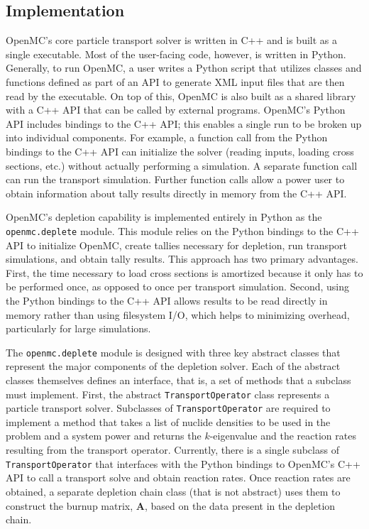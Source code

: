 \documentclass[3p,authoryear]{elsarticle}
\newcommand{\vect}[1]{\mathbf{#1}} %
\begin{document}
\subsection{Implementation}

OpenMC's core particle transport solver is written in C++ and is built as a
single executable. Most of the user-facing code, however, is written in Python.
Generally, to run OpenMC, a user writes a Python script that utilizes classes
and functions defined as part of an API to generate XML input files that are
then read by the executable. On top of this, OpenMC is also built as a shared
library with a C++ API that can be called by external programs. OpenMC's Python
API includes bindings to the C++ API; this enables a single run to be broken up
into individual components. For example, a function call from the Python
bindings to the C++ API can initialize the solver (reading inputs, loading cross
sections, etc.) without actually performing a simulation. A separate function
call can run the transport simulation. Further function calls allow a power user
to obtain information about tally results directly in memory from the C++ API.

OpenMC's depletion capability is implemented entirely in Python as the
\texttt{openmc.deplete} module. This module relies on the Python bindings to the
C++ API to initialize OpenMC, create tallies necessary for depletion, run
transport simulations, and obtain tally results. This approach has two primary
advantages. First, the time necessary to load cross sections is amortized
because it only has to be performed once, as opposed to once per transport
simulation. Second, using the Python bindings to the C++ API allows results to
be read directly in memory rather than using filesystem I/O, which helps to
minimizing overhead, particularly for large simulations.

The \texttt{openmc.deplete} module is designed with three key abstract classes
that represent the major components of the depletion solver. Each of the
abstract classes themselves defines an interface, that is, a set of methods that
a subclass must implement. First, the abstract \texttt{TransportOperator} class
represents a particle transport solver. Subclasses of \texttt{TransportOperator}
are required to implement a method that takes a list of nuclide densities to be
used in the problem and a system power and returns the $k$-eigenvalue and the
reaction rates resulting from the transport operator. Currently, there is a
single subclass of \texttt{TransportOperator} that interfaces with the Python
bindings to OpenMC's C++ API to call a transport solve and obtain reaction rates.
Once reaction rates are obtained, a separate depletion chain class (that is not
abstract) uses them to construct the burnup matrix, $\vect{A}$, based on the
data present in the depletion chain.
\end{document}
